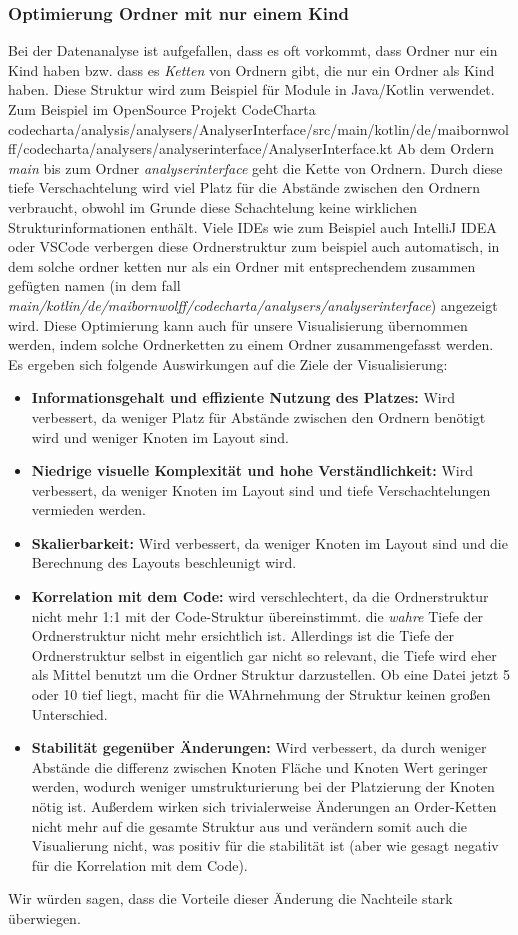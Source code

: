 \subsubsection{Optimierung Ordner mit nur einem Kind}
Bei der Datenanalyse ist aufgefallen, dass es oft vorkommt, dass Ordner nur ein Kind haben bzw. dass es \textit{Ketten} von Ordnern gibt, die nur ein Ordner als Kind haben. Diese Struktur wird zum Beispiel für Module in Java/Kotlin verwendet.
Zum Beispiel im OpenSource Projekt CodeCharta 
codecharta/analysis/analysers/AnalyserInterface/src/main/kotlin/de/maibornwolff/codecharta/analysers/analyserinterface/AnalyserInterface.kt
Ab dem Ordern \textit{main} bis zum Ordner \textit{analyserinterface} geht die Kette von Ordnern.
Durch diese tiefe Verschachtelung wird viel Platz für die Abstände zwischen den Ordnern verbraucht, obwohl im Grunde diese Schachtelung keine wirklichen Strukturinformationen enthält. Viele IDEs wie zum Beispiel auch IntelliJ IDEA oder VSCode verbergen diese Ordnerstruktur zum beispiel auch automatisch, in dem solche ordner ketten nur als ein Ordner mit entsprechendem zusammen gefügten namen (in dem fall \textit{main/kotlin/de/maibornwolff/codecharta/analysers/analyserinterface}) angezeigt wird.
Diese Optimierung kann auch für unsere Visualisierung übernommen werden, indem solche Ordnerketten zu einem Ordner zusammengefasst werden. 
Es ergeben sich folgende Auswirkungen auf die Ziele der Visualisierung:
\begin{itemize}
\item \textbf{Informationsgehalt und effiziente Nutzung des Platzes:} Wird verbessert, da weniger Platz für Abstände zwischen den Ordnern benötigt wird und weniger Knoten im Layout sind. 
    \item \textbf{Niedrige visuelle Komplexität und hohe Verständlichkeit:} Wird verbessert, da weniger Knoten im Layout sind und tiefe Verschachtelungen vermieden werden.
    \item \textbf{Skalierbarkeit:} Wird verbessert, da weniger Knoten im Layout sind und die Berechnung des Layouts beschleunigt wird.
    \item \textbf{Korrelation mit dem Code:} wird verschlechtert, da die Ordnerstruktur nicht mehr 1:1 mit der Code-Struktur übereinstimmt. die \textit{wahre} Tiefe der Ordnerstruktur nicht mehr ersichtlich ist. Allerdings ist die Tiefe der Ordnerstruktur selbst in eigentlich gar nicht so relevant, die Tiefe wird eher als Mittel benutzt um die Ordner Struktur darzustellen. Ob eine Datei jetzt 5 oder 10 tief liegt, macht für die WAhrnehmung der Struktur keinen großen Unterschied.
    \item \textbf{Stabilität gegenüber Änderungen:} Wird verbessert, da durch weniger Abstände die differenz zwischen Knoten Fläche und Knoten Wert geringer werden, wodurch weniger umstrukturierung bei der Platzierung der Knoten nötig ist. Außerdem wirken sich trivialerweise Änderungen an Order-Ketten nicht mehr auf die gesamte Struktur aus und verändern somit auch die Visualierung nicht, was positiv für die stabilität ist (aber wie gesagt negativ für die Korrelation mit dem Code).
\end{itemize}
Wir würden sagen, dass die Vorteile dieser Änderung die Nachteile stark überwiegen.

